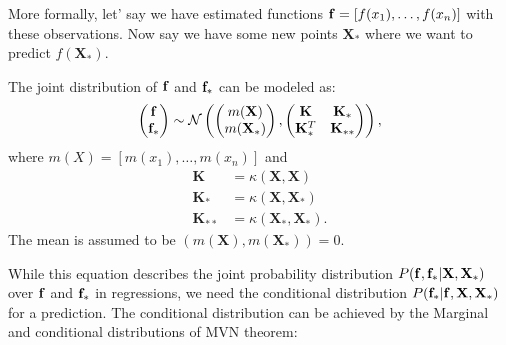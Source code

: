 More formally, let' say we have estimated functions ${\mathbf{f}} = [f(x_1), \dots, f(x_n)]$ with these observations. Now say we have some new points $\mathbf{X}_*$ where we want to predict $f(\mathbf{X}_*)$.

The joint distribution of ${\mathbf{f}}$ and ${\mathbf{f}}_*$ can be modeled as:
\begin{align*}
	\begin{pmatrix}
		{\mathbf{f}}\\
		{\mathbf{f}}_*
		\end{pmatrix}\sim \mathcal{N} 
		\begin{pmatrix}
		\begin{pmatrix}
			m(\mathbf{X})\\
			m(\mathbf{X}_*)
		\end{pmatrix},
		\begin{pmatrix}
			\mathbf{K} & \mathbf{K}_*\\
			\mathbf{K}_*^T & \mathbf{K}_{**}
		\end{pmatrix}
		\end{pmatrix},
\end{align*}
where $m(X) = [m(x_1),\dots, m(x_n)]$ and
\begin{align*}
	\mathbf{K }&= \kappa(\mathbf{X,X})\\
	\mathbf{K}_* &= \kappa(\mathbf{X},\mathbf{X}_*)\\
	\mathbf{K}_{**} &= \kappa(\mathbf{X}_*,\mathbf{X}_*).
\end{align*}
The mean is assumed to be $(m(\mathbf{X}), m(\mathbf{X}_*))=0$. 

While this equation describes the joint probability distribution $P({\mathbf{f}}, {\mathbf{f}}_*|\mathbf{X}, \mathbf{X}_*)$ over ${\mathbf{f}}$ and ${\mathbf{f}}_*$ in regressions, we need the conditional distribution $P({\mathbf{f}}_*|{\mathbf{f}}, \mathbf{X}, \mathbf{X}_*)$ for a prediction. The conditional distribution can be achieved by the Marginal and conditional distributions of MVN theorem:

